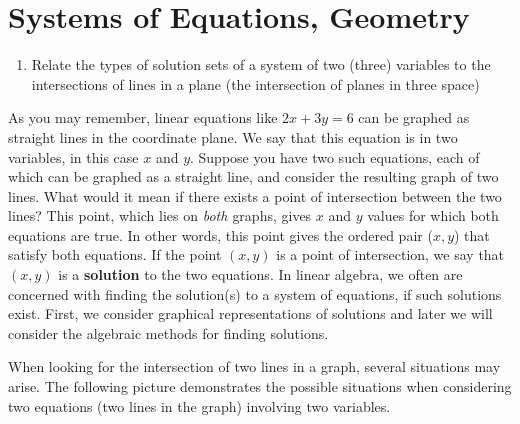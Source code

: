 \section{Systems of Equations, Geometry}

\begin{outcome}
\begin{enumerate}
\item[A.] Relate the types of solution sets of a system of two (three)
variables to the intersections of lines in a plane (the intersection of
planes in three space)
\end{enumerate}
\end{outcome}

As you may remember, linear equations like $2x+3y=6$ can be graphed as
straight lines in the coordinate plane. We say that this equation is
in two variables, in this case $x$ and $y$.  Suppose you have two such
equations, each of which can be graphed as a straight line, and consider
the resulting graph of two lines. What would it mean if there exists a
point of intersection between the two lines? This point, which lies on
{\em both \em} graphs, gives $x$ and $y$ values for which both
equations are true. In other words, this point gives the ordered pair
($x,y$) that satisfy both equations.  If the point $\left( x, y
\right)$ is a point of intersection, we say that $\left( x, y \right)$
is a \textbf{solution} to the two equations. In linear algebra, we
often are concerned with finding the solution(s) to a system of
equations, if such solutions exist.  First, we consider graphical
representations of solutions and later we will consider the algebraic
methods for finding solutions.

When looking for the intersection of two lines in a graph, several situations may arise. The following picture demonstrates the possible situations
when considering two equations (two lines in the graph) involving two variables.

\par{}\label{fig:systemsofequationsGeometry-tikz01}%


